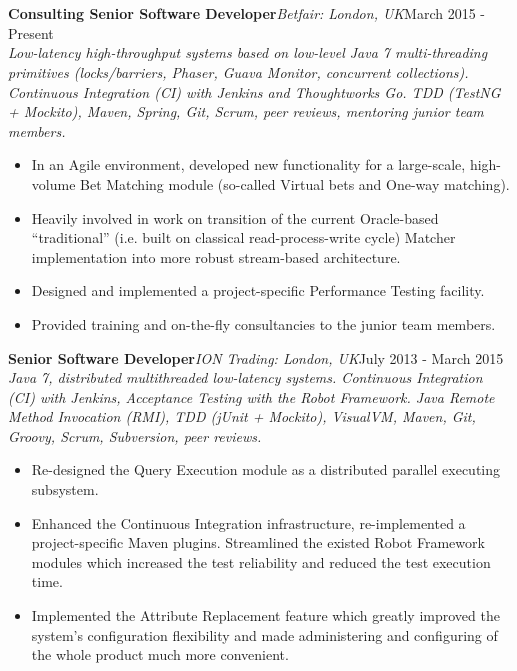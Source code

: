 \documentclass{res}
\newcommand{\jobdes}[4]{\needspace{3\baselineskip} %
{\noindent \bf #3\hspace{2ex}}{{\em \small #1}}{\hfill #2}\\{{\it \small #4.}}}
\newcommand{\osection}[1]{\section{\sc {\Large \textbf{#1}\\}} \vspace{0.30cm}}
\begin{document}
\begin{resume}
\begin{itemize}
\end{itemize}

\osection{Career History}
\jobdes{Betfair: London, UK} {March 2015 - Present}{Consulting Senior Software Developer}
{Low-latency high-throughput systems based on low-level Java 7 multi-threading primitives (locks/barriers, Phaser, Guava Monitor, concurrent collections). Continuous Integration (CI) with Jenkins and Thoughtworks Go. TDD (TestNG + Mockito), Maven, Spring, Git, Scrum, peer reviews, mentoring junior team members}
\begin{itemize}
 \item In an Agile environment, developed new functionality for a large-scale, high-volume Bet Matching module (so-called Virtual bets and One-way matching).
 \item Heavily involved in work on transition of the current Oracle-based ``traditional'' (i.e. built on classical read-process-write cycle) Matcher implementation into more robust stream-based architecture.
 \item Designed and implemented a project-specific Performance Testing facility.
 \item Provided training and on-the-fly consultancies to the junior team members.
 \end{itemize}

\jobdes{ION Trading: London, UK} {July 2013 - March 2015}{Senior Software Developer}
{Java 7, distributed multithreaded low-latency systems. Continuous Integration (CI) with Jenkins, Acceptance Testing with the Robot Framework. Java Remote Method Invocation (RMI), TDD (jUnit + Mockito), VisualVM, Maven, Git, Groovy, Scrum, Subversion, peer reviews}
\begin{itemize}
 \item Re-designed the Query Execution module as a distributed parallel executing subsystem.
 \item Enhanced the Continuous Integration infrastructure, re-implemented a project-specific Maven plugins. Streamlined the existed Robot Framework modules which increased the test reliability and reduced the test execution time.
 \item Implemented the Attribute Replacement feature which greatly improved the system’s configuration flexibility and made administering and configuring of the whole product much more convenient.
 \end{itemize}


\end{resume}
\end{document}
